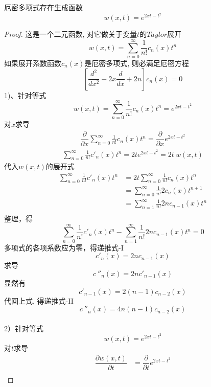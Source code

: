 \begin{proposition}
	厄密多项式存在生成函数
	\begin{equation}\label{eq:Hermi-0}
     w(x,t)=e^{2xt-t^2}
	\end{equation}
\end{proposition}
\begin{proof}
 这是一个二元函数, 对它做关于变量$t$的$Taylor$展开
 \begin{equation*}
	w(x,t) =\sum_{n=0}^{\infty} \frac{1}{n!}  c_n(x) t^n
\end{equation*}
如果展开系数函数$c_n(x)$是厄密多项式, 则必满足厄密方程
\begin{equation*}
	\left[  \frac{d^2}{dx^2} -2x\frac{d}{dx} +2n  \right] c_n(x)=0
\end{equation*}
1)、针对等式  
$$ w(x,t) = \sum_{n=0}^{\infty} \frac{1}{n!}  c_n(x) t^n = e^{2xt-t^2} $$ 
对$x$求导
$$
\begin{aligned}
	\dfrac{\partial }{\partial x} \sum_{n=0}^{\infty} \frac{1}{n!}  c_n (x) t^n =  \dfrac{\partial }{\partial x} e^{2xt-t^2}
\end{aligned}  
$$
$$
\begin{aligned}
	\sum_{n=0}^{\infty} \frac{1}{n!}  c'_n (x) t^n  = 2t e^{2xt-t^2} = 2t ~w(x,t)
\end{aligned}  
$$
代入$w(x,t)$的展开式
$$
\begin{aligned}
	\sum_{n=0}^{\infty} \frac{1}{n!}  c'_n (x) t^n 
	&= 2t \sum_{n=0}^{\infty} \frac{1}{n!}  c_n(x) t^n \\
	&= \sum_{n=0}^{\infty} \frac{1}{n!} 2 c_n(x) t^{n+1} \\ 
	&= \sum_{n=1}^{\infty} \frac{1}{n!} 2n c_{n-1}(x) t^{n} \\ 
\end{aligned}  
$$
整理，得
$$ \sum_{n=0}^{\infty} \frac{1}{n!}  c'_n (x) t^n  - \sum_{n=1}^{\infty} \frac{1}{n!} 2n c_{n-1}(x) t^{n} =0 $$
多项式的各项系数应为零，得递推式-I
\begin{equation}\label{eq:Hermi-1}
	c'_n (x)=2n c_{n-1} (x)	
\end{equation}
求导
$$
c~''_n(x)= 2n c'_{n-1} (x) 
$$
显然有
$$c'_{n-1}(x) = 2(n-1) c_{n-2} (x) $$
代回上式, 得递推式-II
\begin{equation}\label{eq:Hermi-2}
	c~''_n(x)= 4n(n-1) c_{n-2} (x)
\end{equation}
~\\
2）针对等式 
$$ w(x,t) = e^{2xt-t^2} $$ 
对$t$求导
$$
\begin{aligned}
	\dfrac{\partial w(x,t)}{\partial t} &= \dfrac{\partial }{\partial t} e^{2xt-t^2} \\

\end{aligned}$$
\end{proof}
